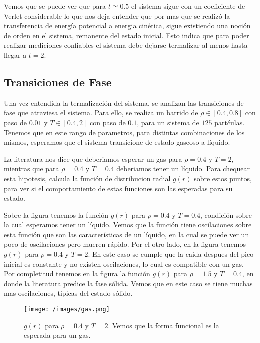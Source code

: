 \documentclass[%
 reprint,
 amsmath,amssymb,
 aps,
]{revtex4-1}
\begin{document}
Vemos que se puede ver que para $t \simeq 0.5$ el sistema sigue con un
coeficiente de Verlet considerable lo que nos deja entender que por mas que se
realiz\'o la transferencia de energ\'ia potencial a energia cin\'etica, sigue
existiendo una noci\'on de orden en el sistema, remanente del estado inicial.
Esto indica que para poder realizar mediciones confiables el sistema debe
dejarse termalizar al menos hasta llegar a $t = 2$.

\subsection{Transiciones de Fase}

Una vez entendida la termalizaci\'on del sistema, se analizan las transiciones
de fase que atraviesa el sistema. Para ello, se realiza un barrido de
$\rho \in [0.4, 0.8]$ con paso de $0.01$ y $T \in [0.4, 2]$ con paso de $0.1$,
para un sistema de $125$ part\'culas. Tenemos que en este rango de parametros,
para distintas combinaciones de los mismos, esperamos que el sistema transicione
de estado gaseoso a l\'iquido.

La literatura nos dice que deberiamos esperar un gas para $\rho = 0.4$ y $T = 2$,
mientras que para $\rho = 0.4$ y $T = 0.4$ deberiamos tener un l\'iquido. Para
chequear esta hipotesis, calcula la funci\'on de distribucion radial $g(r)$
sobre estos puntos, para ver si el comportamiento de estas funciones son las
esperadas para su estado.

Sobre la figura \label{liquido} tenemos la funci\'on $g(r)$ para $\rho = 0.4$ y
$T = 0.4$, condici\'on sobre la cual esperamos tener un l\'iquido. Vemos que
la funci\'on tiene oscilaciones sobre esta funci\'on que son las
caracter\'isticas de un l\'iquido, en la cual se puede ver un poco de
oscilaciones pero mueren r\'apido. Por el otro lado, en la figura \label{gas}
tenemos $g(r)$ para $\rho = 0.4$ y $T = 2$. En este caso se cumple que la caida
despues del pico inicial es constante y no existen oscilaciones, lo cual es
compatible con un gas. Por completitud tenemos en la figura \label{solido} la
funci\'on $g(r)$ para $\rho = 1.5$ y $T = 0.4$, en donde la literatura predice
la fase s\'olida. Vemos que en este caso se tiene muchas mas oscilaciones,
tipicas del estado s\'olido.

\begin{figure}
  \begin{center}
  \texttt{[image: /images/gas.png]}
  \caption{$g(r)$ para $\rho = 0.4$ y $T = 2$. Vemos que la forma funcional
  es la esperada para un gas.}
  \label{gas}
\end{center}
\end{figure}
\end{document}
